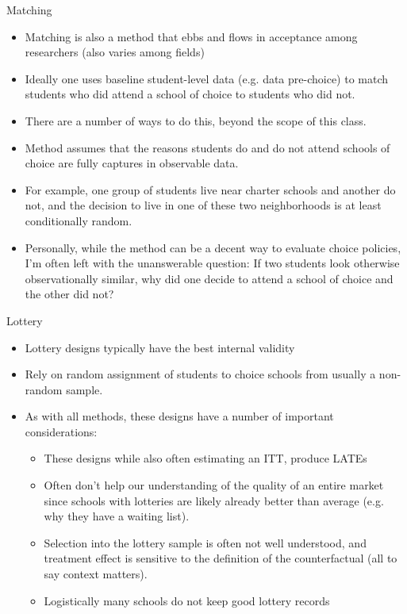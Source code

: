 \documentclass{beamer}
\begin{document}
\begin{frame}[<+->]{Matching}
	\begin{itemize}
		\item Matching is also a method that ebbs and flows in acceptance among researchers (also varies among fields)
		\item Ideally one uses baseline student-level data (e.g. data pre-choice) to match students who did attend a school of choice to students who did not. 
		\item There are a number of ways to do this, beyond the scope of this class. 
		\item Method assumes that the reasons students do and do not attend schools of choice are fully captures in observable data. 
		\item For example, one group of students live near charter schools and another do not, and the decision to live in one of these two neighborhoods is at least conditionally random. 
		\item Personally, while the method can be a decent way to evaluate choice policies, I'm often left with the unanswerable question: If two students look otherwise observationally similar, why did one decide to attend a school of choice and the other did not?
		\end{itemize}

\end{frame}


\begin{frame}[<+->]{Lottery}
	\begin{itemize}
		\item Lottery designs typically have the best internal validity
		\item Rely on random assignment of students to choice schools from usually a non-random sample. 
		\item As with all methods, these designs have a number of important considerations:
		\begin{itemize}
			\item These designs while also often estimating an ITT, produce LATEs
			\item Often don't help our understanding of the quality of an entire market  since schools with lotteries are likely already better than average (e.g. why they have a waiting list). 
			\item Selection into the lottery sample is often not well understood, and treatment effect is sensitive to the definition of the counterfactual (all to say context matters). 
			\item Logistically many schools do not keep good lottery records
		\end{itemize}
	\end{itemize}
\end{frame}
\end{document}
